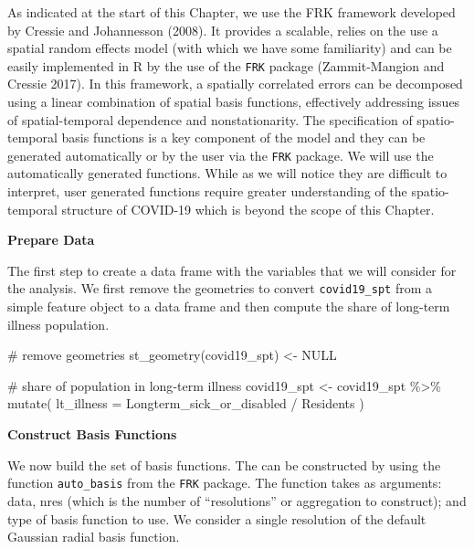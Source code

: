 \documentclass[
  letterpaper,
  DIV=11,
  numbers=noendperiod,
  oneside]{scrreprt}
\newenvironment{Shaded}{\begin{snugshade}}{\end{snugshade}}
\newcommand{\AttributeTok}[1]{\textcolor[rgb]{0.40,0.45,0.13}{#1}}
\newcommand{\CommentTok}[1]{\textcolor[rgb]{0.37,0.37,0.37}{#1}}
\newcommand{\ConstantTok}[1]{\textcolor[rgb]{0.56,0.35,0.01}{#1}}
\newcommand{\FunctionTok}[1]{\textcolor[rgb]{0.28,0.35,0.67}{#1}}
\newcommand{\NormalTok}[1]{\textcolor[rgb]{0.00,0.23,0.31}{#1}}
\newcommand{\OtherTok}[1]{\textcolor[rgb]{0.00,0.23,0.31}{#1}}
\newcommand{\SpecialCharTok}[1]{\textcolor[rgb]{0.37,0.37,0.37}{#1}}
\begin{document}
As indicated at the start of this Chapter, we use the FRK framework
developed by Cressie and Johannesson (2008). It provides a scalable,
relies on the use a spatial random effects model (with which we have
some familiarity) and can be easily implemented in R by the use of the
\texttt{FRK} package (Zammit-Mangion and Cressie 2017). In this
framework, a spatially correlated errors can be decomposed using a
linear combination of spatial basis functions, effectively addressing
issues of spatial-temporal dependence and nonstationarity. The
specification of spatio-temporal basis functions is a key component of
the model and they can be generated automatically or by the user via the
\texttt{FRK} package. We will use the automatically generated functions.
While as we will notice they are difficult to interpret, user generated
functions require greater understanding of the spatio-temporal structure
of COVID-19 which is beyond the scope of this Chapter.

\textbf{Prepare Data}

The first step to create a data frame with the variables that we will
consider for the analysis. We first remove the geometries to convert
\texttt{covid19\_spt} from a simple feature object to a data frame and
then compute the share of long-term illness population.

\begin{Shaded}
\begin{Highlighting}[]
\CommentTok{\# remove geometries}
\FunctionTok{st\_geometry}\NormalTok{(covid19\_spt) }\OtherTok{\textless{}{-}} \ConstantTok{NULL}

\CommentTok{\# share of population in long{-}term illness }
\NormalTok{covid19\_spt }\OtherTok{\textless{}{-}}\NormalTok{ covid19\_spt }\SpecialCharTok{\%\textgreater{}\%} \FunctionTok{mutate}\NormalTok{(}
 \AttributeTok{lt\_illness =}\NormalTok{ Longterm\_sick\_or\_disabled }\SpecialCharTok{/}\NormalTok{ Residents}
\NormalTok{)}
\end{Highlighting}
\end{Shaded}

\textbf{Construct Basis Functions}

We now build the set of basis functions. The can be constructed by using
the function \texttt{auto\_basis} from the \texttt{FRK} package. The
function takes as arguments: data, nres (which is the number of
``resolutions'' or aggregation to construct); and type of basis function
to use. We consider a single resolution of the default Gaussian radial
basis function.
\end{document}
